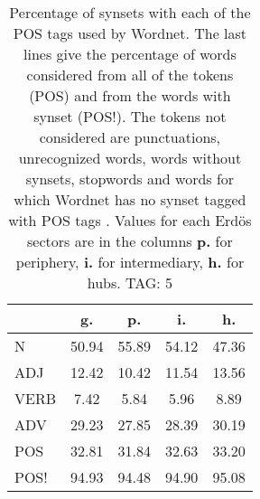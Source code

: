 \begin{table}[h!]
\begin{center}
\begin{tabular}{| l | c | c | c | c |}\hline
 & g. & p. & i. & h. \\\hline
N & 50.94  & 55.89  & 54.12  & 47.36 \\\hline
ADJ & 12.42  & 10.42  & 11.54  & 13.56 \\\hline
VERB & 7.42  & 5.84  & 5.96  & 8.89 \\\hline
ADV & 29.23  & 27.85  & 28.39  & 30.19 \\\hline
POS & 32.81  & 31.84  & 32.63  & 33.20 \\\hline
POS! & 94.93  & 94.48  & 94.90  & 95.08 \\\hline
\end{tabular}
\caption{Percentage of synsets with each of the POS tags used by Wordnet. The last lines give the percentage of words considered from all of the tokens (POS) and from the words with synset (POS!). The tokens not considered are punctuations, unrecognized words, words without synsets, stopwords and words for which Wordnet has no synset  tagged with POS tags . Values for each Erd\"os sectors are in the columns {{\bf p.}} for periphery, {{\bf i.}} for intermediary, {{\bf h.}} for hubs. TAG: 5}
\end{center}
\end{table}